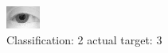 \begin{figure}[h!]
\begin{center}
\includegraphics[width=0.60\columnwidth]{figures/ID1136_class_2_target_3.png}
\end{center}
\caption{ Classification: 2 actual target: 3}
\label{fig:ID1136_class_2_target_3}
\end{figure}
